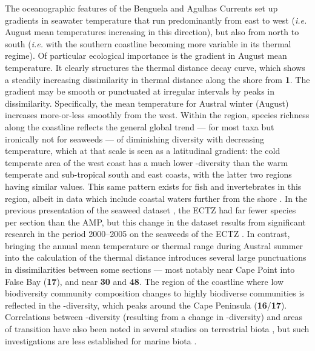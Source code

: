 \documentclass[utf8]{frontiersSCNS} %
\begin{document}
The oceanographic features of the Benguela and Agulhas Currents set up gradients in seawater temperature that run predominantly from east to west (\emph{i.e.} August mean temperatures increasing in this direction), but also from north to south (\emph{i.e.} with the southern coastline becoming more variable in its thermal regime). Of particular ecological importance is the gradient in August mean temperature. It clearly structures the thermal distance decay curve, which shows a steadily increasing dissimilarity in thermal distance along the shore from \textbf{1}. The gradient may be smooth or punctuated at irregular intervals by peaks in dissimilarity. Specifically, the mean temperature for Austral winter (August) increases more-or-less smoothly from the west. Within the region, species richness along the coastline reflects the general global trend --- for most taxa but ironically not for seaweeds \citep{Bolton1994,Santelices2009} --- of diminishing diversity with decreasing temperature, which at that scale is seen as a latitudinal gradient: the cold temperate area of the west coast has a much lower \textalpha-diversity than the warm temperate and sub-tropical south and east coasts, with the latter two regions having similar values. This same pattern exists for fish and invertebrates in this region, albeit in data which include coastal waters further from the shore \citep{Griffiths2010}. In the previous presentation of the seaweed dataset \citep{Bolton2002}, the ECTZ had far fewer species per section than the AMP, but this change in the dataset results from significant research in the period 2000--2005 on the seaweeds of the ECTZ \citep{DeClerck2005}. In contrast, bringing the annual mean temperature or thermal range during Austral summer into the calculation of the thermal distance introduces several large punctuations in dissimilarities between some sections --- most notably near Cape Point into False Bay (\textbf{17}), and near \textbf{30} and \textbf{48}. The region of the coastline where low biodiversity community composition changes to highly biodiverse communities is reflected in the \textbeta-diversity, which peaks around the Cape Peninsula (\textbf{16}/\textbf{17}). Correlations between \textbeta-diversity (resulting from a change in \textalpha-diversity) and areas of transition have also been noted in several studies on terrestrial biota \citep{Melo2009,Tonial2012}, but such investigations are less established for marine biota \citep{Schils2006,Anderson2013}.
\end{document}
